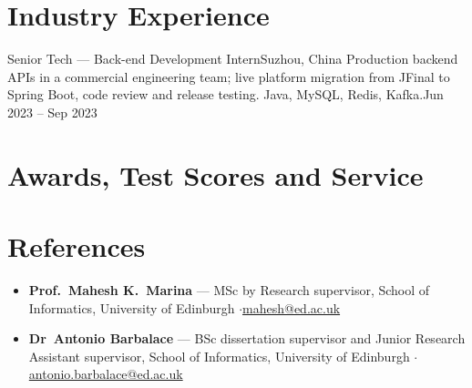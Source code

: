 \section{Industry Experience}
  \resumeSubHeadingListStart
    \resumeSubheading
      {Senior Tech --- Back-end Development Intern}{Suzhou, China}
      {Production backend APIs in a commercial engineering team; live platform migration from JFinal to Spring Boot, code review and release testing. Java, MySQL, Redis, Kafka.}{Jun 2023 -- Sep 2023}
  \resumeSubHeadingListEnd

\section{Awards, Test Scores and Service}
  \begin{itemize}[leftmargin=*]
  \end{itemize}

\section{References}
  \begin{itemize}[leftmargin=*]
    \item\small{\textbf{Prof.\ Mahesh K.\ Marina} --- MSc by Research supervisor, School of Informatics, University of Edinburgh \quad$\cdot$\quad \href{mailto:mahesh@ed.ac.uk}{mahesh@ed.ac.uk} \vspace{-3pt}}
    \item\small{\textbf{Dr\ Antonio Barbalace} --- BSc dissertation supervisor and Junior Research Assistant supervisor, School of Informatics, University of Edinburgh \quad$\cdot$\quad \href{mailto:antonio.barbalace@ed.ac.uk}{antonio.barbalace@ed.ac.uk} \vspace{-3pt}}
  \end{itemize}
